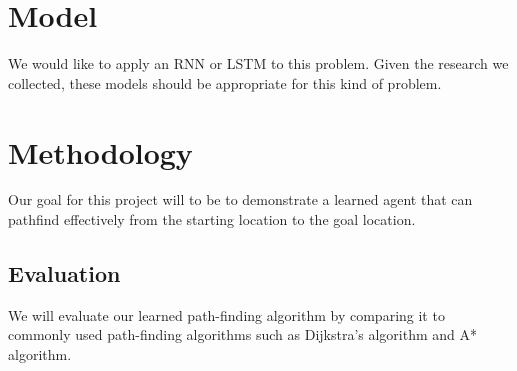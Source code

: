 \documentclass[sigplan,screen]{acmart}
\begin{document}
\section{Model}
We would like to apply an RNN or LSTM to this problem. Given the research we
collected, these models should be appropriate for this kind of problem.

\section{Methodology}
Our goal for this project will to be to demonstrate a learned agent that can
pathfind effectively from the starting location to the goal location.

\subsection{Evaluation}
We will evaluate our learned path-finding algorithm by comparing it to commonly
used path-finding algorithms such as Dijkstra's algorithm and A* algorithm.



\end{document}
